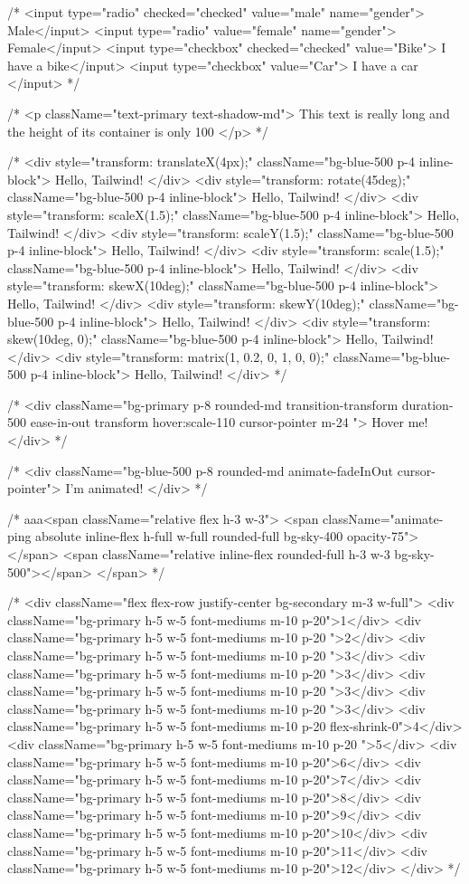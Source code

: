 {  {/* <input type="radio" checked="checked" value="male" name="gender"> Male</input>
  <input type="radio" value="female" name="gender"> Female</input>
  <input type="checkbox" checked="checked" value="Bike"> I have a bike</input>
  <input type="checkbox" value="Car"> I have a car </input> */}
  
  {/* <p className="text-primary text-shadow-md">
        This text is really long and the height of its container is only 100
        </p> */}

{/* <div style="transform: translateX(4px);" className="bg-blue-500 p-4 inline-block">
  Hello, Tailwind!
</div>
<div style="transform: rotate(45deg);" className="bg-blue-500 p-4 inline-block">
  Hello, Tailwind!
</div>
<div style="transform: scaleX(1.5);" className="bg-blue-500 p-4 inline-block">
  Hello, Tailwind!
</div>
<div style="transform: scaleY(1.5);" className="bg-blue-500 p-4 inline-block">
  Hello, Tailwind!
</div>
<div style="transform: scale(1.5);" className="bg-blue-500 p-4 inline-block">
  Hello, Tailwind!
</div>
<div style="transform: skewX(10deg);" className="bg-blue-500 p-4 inline-block">
  Hello, Tailwind!
</div>
<div style="transform: skewY(10deg);" className="bg-blue-500 p-4 inline-block">
  Hello, Tailwind!
</div>
<div style="transform: skew(10deg, 0);" className="bg-blue-500 p-4 inline-block">
  Hello, Tailwind!
</div>
<div style="transform: matrix(1, 0.2, 0, 1, 0, 0);" className="bg-blue-500 p-4 inline-block">
  Hello, Tailwind!
</div> */}

{/* <div className="bg-primary p-8 rounded-md transition-transform duration-500 ease-in-out transform hover:scale-110 cursor-pointer m-24 ">
  Hover me!
</div> */}

{/* <div className="bg-blue-500 p-8 rounded-md animate-fadeInOut cursor-pointer">
  I'm animated!
</div> */}

{/* aaa<span className="relative flex h-3 w-3">
  <span className="animate-ping absolute inline-flex h-full w-full rounded-full bg-sky-400 opacity-75"></span>
  <span className="relative inline-flex rounded-full h-3 w-3 bg-sky-500"></span>
</span> */}

{/* <div className="flex flex-row justify-center bg-secondary m-3 w-full">
  <div className="bg-primary h-5 w-5 font-mediums m-10 p-20">1</div>
  <div className="bg-primary h-5 w-5 font-mediums m-10 p-20 ">2</div>
  <div className="bg-primary h-5 w-5 font-mediums m-10 p-20 ">3</div>  
  <div className="bg-primary h-5 w-5 font-mediums m-10 p-20 ">3</div>  
  <div className="bg-primary h-5 w-5 font-mediums m-10 p-20 ">3</div>  
  <div className="bg-primary h-5 w-5 font-mediums m-10 p-20 ">3</div>  
  <div className="bg-primary h-5 w-5 font-mediums m-10 p-20 flex-shrink-0">4</div>
  <div className="bg-primary h-5 w-5 font-mediums m-10 p-20 ">5</div>
  <div className="bg-primary h-5 w-5 font-mediums m-10 p-20">6</div>  
  <div className="bg-primary h-5 w-5 font-mediums m-10 p-20">7</div>
  <div className="bg-primary h-5 w-5 font-mediums m-10 p-20">8</div>
  <div className="bg-primary h-5 w-5 font-mediums m-10 p-20">9</div>  
  <div className="bg-primary h-5 w-5 font-mediums m-10 p-20">10</div>
  <div className="bg-primary h-5 w-5 font-mediums m-10 p-20">11</div>
  <div className="bg-primary h-5 w-5 font-mediums m-10 p-20">12</div>  
</div> */}

}
